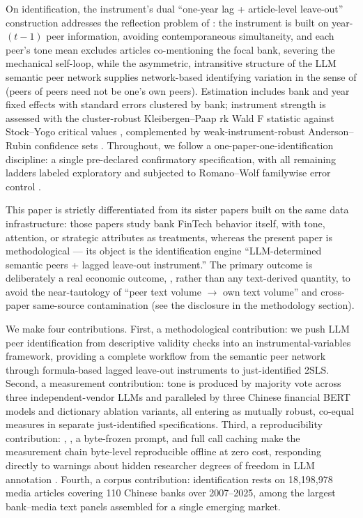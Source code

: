 On identification, the instrument's dual ``one-year lag + article-level leave-out''
construction addresses the reflection problem of \textcite{manski1993reflection}: the
instrument is built on year-$(t-1)$ peer information, avoiding contemporaneous simultaneity,
and each peer's tone mean excludes articles co-mentioning the focal bank, severing the
mechanical self-loop,
while the asymmetric, intransitive structure of the LLM semantic peer network supplies
network-based identifying variation in the sense of \textcite{bramoulle2009networks} (peers of
peers need not be one's own peers). Estimation includes bank and year fixed effects with
standard errors clustered by bank; instrument strength is assessed with the cluster-robust
Kleibergen--Paap rk Wald F statistic \parencite{kleibergen2006rank} against Stock--Yogo
critical values \parencite{stock2005weak}, complemented by weak-instrument-robust
Anderson--Rubin confidence sets \parencite{andrews2019weakiv}. Throughout, we follow a
one-paper-one-identification discipline: a single pre-declared confirmatory specification, with
all remaining ladders labeled exploratory and subjected to Romano--Wolf familywise error
control \parencite{romano2005stepdown}.

This paper is strictly differentiated from its sister papers built on the same data
infrastructure: those papers study bank FinTech behavior itself, with tone, attention, or
strategic attributes as treatments, whereas the present paper is methodological --- its object
is the identification engine ``LLM-determined semantic peers + lagged leave-out instrument.'' The
primary outcome is deliberately a real economic outcome, , rather than any
text-derived quantity, to avoid the near-tautology of ``peer text volume $\rightarrow$ own
text volume'' and cross-paper same-source contamination (see the disclosure in the methodology
section).

We make four contributions. First, a methodological contribution: we push LLM peer
identification \parencite{cao2025genai} from descriptive validity checks into an
instrumental-variables framework, providing a complete workflow from the semantic peer network
through formula-based lagged leave-out instruments to just-identified 2SLS. Second, a measurement
contribution: tone is produced by majority vote across three independent-vendor LLMs and
paralleled by three Chinese financial BERT models and dictionary ablation variants, all
entering as mutually robust, co-equal measures in separate just-identified specifications.
Third, a reproducibility contribution: , , a byte-frozen
prompt, and full call caching make the measurement chain byte-level reproducible offline at
zero cost, responding directly to warnings about hidden researcher degrees of freedom in LLM
annotation \parencite{baumann2025llmhacking}. Fourth, a corpus contribution: identification
rests on 18{,}198{,}978 media articles covering 110 Chinese banks over 2007--2025, among
the largest bank--media text panels assembled for a single emerging market.

